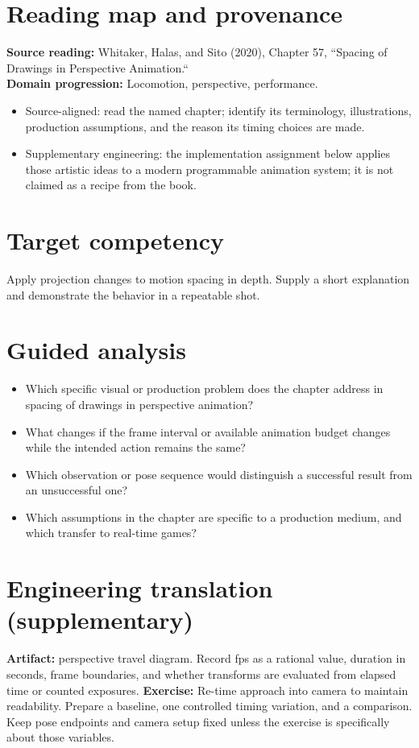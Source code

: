\documentclass[10pt,letterpaper]{article}
\begin{document}
\makedoctitle
\makedocsummary

\section{Reading map and provenance}
\textbf{Source reading:} Whitaker, Halas, and Sito (2020), Chapter 57, ``Spacing of Drawings in Perspective Animation.``\\
\textbf{Domain progression:} Locomotion, perspective, performance.
\begin{itemize}
\item Source-aligned: read the named chapter; identify its terminology, illustrations, production assumptions, and the reason its timing choices are made.
\item Supplementary engineering: the implementation assignment below applies those artistic ideas to a modern programmable animation system; it is not claimed as a recipe from the book.
\end{itemize}
\section{Target competency}
Apply projection changes to motion spacing in depth. Supply a short explanation and demonstrate the behavior in a repeatable shot.
\section{Guided analysis}
\begin{itemize}
\item Which specific visual or production problem does the chapter address in spacing of drawings in perspective animation?
\item What changes if the frame interval or available animation budget changes while the intended action remains the same?
\item Which observation or pose sequence would distinguish a successful result from an unsuccessful one?
\item Which assumptions in the chapter are specific to a production medium, and which transfer to real-time games?
\end{itemize}
\section{Engineering translation (supplementary)}
\textbf{Artifact:} perspective travel diagram. Record fps as a rational value, duration in seconds, frame boundaries, and whether transforms are evaluated from elapsed time or counted exposures.
\textbf{Exercise:} Re-time approach into camera to maintain readability. Prepare a baseline, one controlled timing variation, and a comparison. Keep pose endpoints and camera setup fixed unless the exercise is specifically about those variables.
\end{document}
